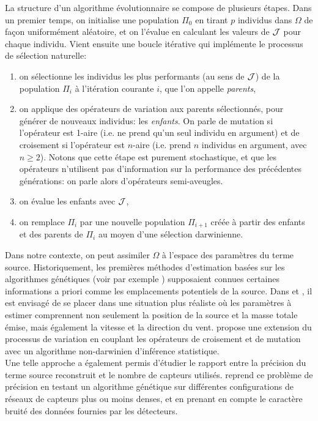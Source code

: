  La structure d'un algorithme évolutionnaire se compose de plusieurs étapes. Dans un premier temps, on initialise une population $\Pi_0$ en tirant $p$ individus dans $\Omega$ de façon uniformément aléatoire, et on l'évalue en calculant les valeurs de ${\mathcal{J}}$ pour chaque individu. Vient ensuite une boucle itérative qui implémente le processus de sélection naturelle:
 \begin{enumerate}
 	\item on sélectionne les individus les plus performants (au sens de ${\mathcal{J}}$) de la population $\Pi_i$ à l'itération courante $i$, que l'on appelle \textit{parents},
 	\item on applique des opérateurs de variation aux parents sélectionnés, pour générer de nouveaux individus: les \textit{enfants}. On parle de mutation si l'opérateur est 1-aire (i.e. ne prend qu'un seul individu en argument) et de croisement si l'opérateur est $n$-aire (i.e. prend $n$ individus en argument, avec $n \geq 2$). Notons que cette étape est purement stochastique, et que les opérateurs n'utilisent pas d'information sur la performance des précédentes générations: on parle alors d'opérateurs semi-aveugles.
 	\item on évalue les enfants avec ${\mathcal{J}}$,
 	\item on remplace $\Pi_i$  par une nouvelle population $\Pi_{i+1}$ créée à partir des enfants et des parents de $\Pi_i$ au moyen d'une sélection darwinienne.\\
 \end{enumerate}
 
 Dans notre contexte, on peut assimiler $\Omega$ à l'espace des paramètres du terme source. Historiquement, les premières méthodes d'estimation basées sur les algorithmes génétiques (voir par exemple \cite{Haupt2005}) supposaient connues certaines informations a priori comme les emplacements potentiels de la source. Dans \cite{Allen2007} et \cite{Haupt2007}, il est envisagé de se placer dans une situation plus réaliste où les paramètres à estimer comprennent non seulement la position de la source et la masse totale émise, mais également la vitesse et la direction du vent. \cite{Cervone2011} propose une extension du processus de variation en couplant les opérateurs de croisement et de mutation avec un algorithme non-darwinien d'inférence statistique.\\ 
 
 Une telle approche a également permis d'étudier le rapport entre la précision du terme source reconstruit et le nombre de capteurs utilisés. \cite{Long2010} reprend ce problème de précision en testant un algorithme génétique sur différentes configurations de réseaux de capteurs plus ou moins denses, et en prenant en compte le caractère bruité des données fournies par les détecteurs. \\
 
